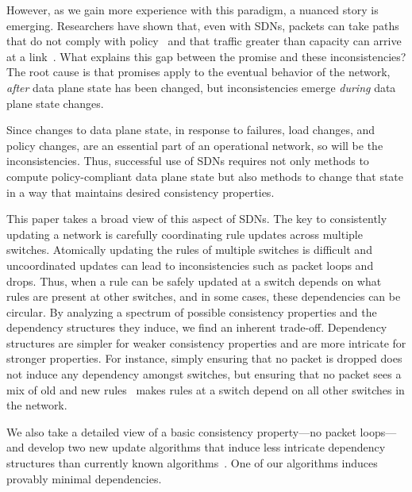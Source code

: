 However, as we gain more experience with this paradigm, a nuanced story is emerging.  Researchers have shown that, even with SDNs, packets can take paths that do not comply with policy~\cite{safeupdate} and that traffic greater than capacity can arrive at a link~\cite{swan}. What explains this gap between the promise and these inconsistencies? The root cause is that promises apply to the eventual behavior of the network, {\em after} data plane state has been changed, but inconsistencies emerge {\em during} data plane state changes.

Since changes to data plane state, in response to failures, load changes, and policy changes, are an essential part of an operational network, so will be the inconsistencies. Thus, successful use of SDNs requires not only methods to compute policy-compliant data plane state but also methods to change that state in a way that maintains desired consistency properties.


This paper takes a broad view of this aspect of SDNs. The key to consistently updating a network is carefully coordinating rule updates across multiple switches.  Atomically updating the rules of multiple switches is difficult and uncoordinated updates can lead to inconsistencies such as packet loops and drops. Thus, when a rule can be safely updated at a switch depends on what rules are present at other switches, and in some cases, these dependencies can be circular.
By analyzing a spectrum of possible consistency properties and the dependency structures they induce, we find an inherent trade-off. Dependency structures are simpler for weaker consistency properties and are more intricate for stronger properties.  For instance, simply ensuring that no packet is dropped does not induce any dependency amongst switches, but ensuring that no packet sees a mix of old and new rules~\cite{safeupdate} makes rules at a switch depend on all other switches in the network.

We also take a detailed view of a basic consistency property---no packet loops---and develop two new update algorithms that induce less intricate dependency structures than currently known algorithms~\cite{safeupdate}. One of our algorithms induces provably minimal dependencies.

